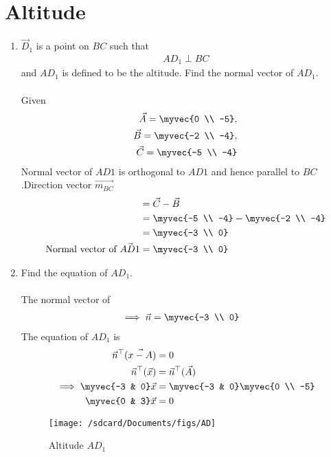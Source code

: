 \documentclass[11pt]{book}
\begin{document}
\section{Altitude}
\begin{enumerate}[label=\thesection.\arabic*.,ref=\thesection.\theenumi]

\item $\vec{D}_1$ is a point on $BC$ such that
		\begin{align}
			AD_1 \perp BC
		\end{align}
		and $AD_1$ is defined to be the altitude. 
		Find the normal vector of $AD_1$.\\
\solution\\
Given
\begin{align}
\vec{A} = \myvec{0 \\ -5},\\
\vec{B} = \myvec{-2 \\ -4},\\
\vec{C} = \myvec{-5 \\ -4}
\end{align}
Normal vector of $AD1$ is orthogonal to $AD1$ and hence parallel to $BC$.Direction vector $\vec{m_{BC}}$\\
\begin{align}
	&= \vec{C} - \vec{B}\\
        &= \myvec{-5 \\ -4} - \myvec{-2 \\ -4}\\
        &= \myvec{-3 \\ 0}\\
        \text{Normal vector of } \vec{AD1} &= \myvec{-3 \\ 0}
\end{align}

\item Find the equation of $AD_1$. \\
\solution\\
The normal vector of
\begin{align}
\implies \vec{n} &= \myvec{-3 \\ 0}
\end{align}
The equation of $AD_1$ is
\begin{align}
 \vec{n}^{\top}(\vec{x-A}) &= 0 \\
 \vec{n}^{\top}(\vec{x}) &= \vec{n}^{\top}(\vec{A})\\
\implies \myvec{-3 & 0}\vec{x} &= \myvec{-3 & 0}\myvec{0 \\ -5}\\
\myvec{0 & 3}\vec{x} &= 0
\end{align}
\begin{figure}[H]
\texttt{[image: /sdcard/Documents/figs/AD]}
\caption{Altitude $AD_1$}
\label{fig:Line AD}
\end{figure}


\end{enumerate}
\end{document}
